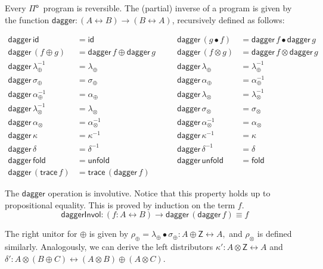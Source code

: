 \documentclass[runningheads,a4paper]{llncs}
\newcommand{\Pio}{\ensuremath{\mathsf{\Pi}^{\mathsf{o}}}}
\newcommand{\Ty}{\mathsf{Ty}}
\newcommand{\id}{\mathsf{id}}
\newcommand{\lr}{\longleftrightarrow}
\newcommand{\fold}{\mathsf{fold}}
\newcommand{\unfold}{\mathsf{unfold}}
\newcommand{\trace}{\ensuremath{\mathsf{trace}}}
\newcommand{\Z}{\mathsf{Z}}
\renewcommand{\dagger}{\mathsf{dagger}}
\begin{document}
Every \Pio\ program is reversible. The (partial) inverse of a program is given by
the function $\dagger : (A \lr B) \to (B \lr A)$, recursively defined
as follows:

\[
\begin{array}{llcll}
\dagger \,\id &= \id & \quad &
\dagger\, (g \bullet f) & = \dagger\, f \bullet \dagger\, g \\
\dagger\, (f \oplus g) & = \dagger\, f \oplus \dagger\, g & \quad &
\dagger\, (f \otimes g) & = \dagger\, f \otimes \dagger\, g \\
\dagger\, \lambda_\oplus ^{-1} & = \lambda_\oplus & \quad &
\dagger\, \lambda_\oplus & = \lambda_\oplus^{-1} \\
\dagger\, \sigma_\oplus & = \sigma_\oplus & \quad &
\dagger\, \alpha_\oplus & = \alpha_\oplus^{-1} \\
\dagger\, \alpha_\oplus^{-1} & = \alpha_\oplus & \quad &
\dagger\, \lambda_\otimes & = \lambda_\otimes^{-1} \\
\dagger\, \lambda_\otimes ^{-1} & = \lambda_\otimes & \quad &
\dagger\, \sigma_\otimes & = \sigma_\otimes \\
\dagger\, \alpha_\otimes & = \alpha_\otimes^{-1} & \quad &
\dagger\, \alpha_\otimes^{-1} & = \alpha_\otimes \\
\dagger\, \kappa & = \kappa^{-1} & \quad &
\dagger\, \kappa^{-1} & = \kappa \\
\dagger\, \delta & = \delta^{-1} & \quad &
\dagger\, \delta^{-1} & = \delta \\
\dagger\, \fold & = \unfold & \quad &
\dagger\, \unfold & = \fold \\
\dagger\, (\trace \,f) & = \trace \,(\dagger\, f)
\end{array}
\]

The $\dagger$ operation is involutive. Notice that this property holds
up to propositional equality. This is proved by induction on the term
$f$.
\[
\mathsf{daggerInvol} : (f : A \lr B) \to \dagger \,(\dagger\,f) \equiv f
\]

The right unitor for $\oplus$ is given by $\rho_\oplus = \lambda_\oplus \bullet
\sigma_\oplus : A \oplus \Z \lr A,$ and $\rho_\otimes$ is defined similarly.
Analogously, we can derive the left distributors $\kappa' : A \otimes \Z
\lr A$ and $\delta' : A \otimes (B \oplus C) \lr (A \otimes B) \oplus
(A \otimes C)$.
\end{document}
